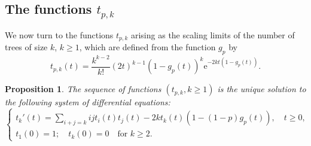 \documentclass[a4, 11pt]{article}
\numberwithin{equation}{section}
\theoremstyle{plain}
\newtheorem{proposition}[theorem]{Proposition}
\theoremstyle{definition}
\theoremstyle{remark}
\begin{document}
\subsection{The functions $t_{p,k}$}
\label{sec:t_k}

We now turn to the functions $t_{p,k}$ arising as the scaling limits of the number of trees of size $k$, $k\geq 1$, which are defined from the function $g_p$ by
$$
t_{p,k}(t)=\frac{k^{k-2}}{k!}\left(2t\right)^{k-1}\left(1-g_p(t)\right)^k \mathrm{e}^{-2kt\left(1-g_p(t)\right)}.
$$

\bigskip

\begin{proposition}
The sequence of functions $(t_{p,k},k\geq 1)$ is the unique solution to the following system of differential equations:
\begin{equation*}
\label{eq_lim_trees}
	\left\{
	\begin{array}{ll}
		t_k'(t)=\sum_{i+j=k}ijt_i(t)t_j(t)-2kt_k(t)\left(1-(1-p)g_p(t)\right),  \quad t\geq 0, \\
		t_1(0)=1; \quad t_k(0)=0 \quad \text{for }k\geq 2.
	\end{array}
	\right.
\end{equation*}
\end{proposition}
\end{document}
